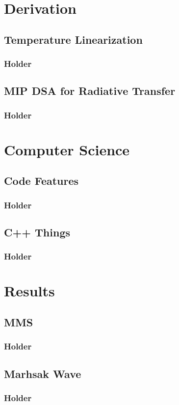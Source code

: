 \documentclass{beamer}
\begin{document}
\section{Derivation}
\subsection{Temperature Linearization}
\begin{frame}
\frametitle{Holder}
\end{frame}

\subsection{MIP DSA for Radiative Transfer}
\begin{frame}
\frametitle{Holder}
\end{frame}

\section{Computer Science}
\subsection{Code Features}
\begin{frame}
\frametitle{Holder}
\end{frame}

\subsection{C++ Things}
\begin{frame}
\frametitle{Holder}
\end{frame}

\section{Results}
\subsection{MMS}
\begin{frame}
\frametitle{Holder}
\end{frame}

\subsection{Marhsak Wave}
\begin{frame}
\frametitle{Holder}
\end{frame}
\end{document}
